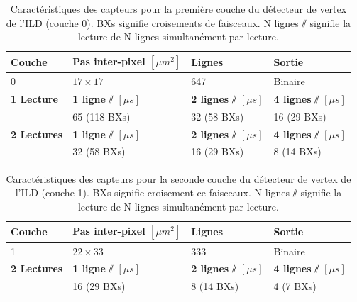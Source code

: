  \begin{table}[h]
  \centering
  \begin{tabular}{|l|l|l|l|}
  \hline
  \textbf{Couche}               & \textbf{ Pas inter-pixel} $[\mu m^2]$ & \textbf{ Lignes}                & \textbf{ Sortie}                \\ \hline
         0        & $17 \times 17$                  & 647                         & Binaire                     \\ \hline
  \textbf{1 Lecture}  & \textbf{1 ligne} $\sslash$ $[\mu s]$    & \textbf{2 lignes} $\sslash$ $[\mu s]$ & \textbf{4 lignes} $\sslash$ $[\mu s]$ \\ \hline
                 & 65 (118 BXs)                    & 32 (58 BXs)                 & 16 (29 BXs)                 \\ \hline
  \textbf{2 Lectures} & \textbf{ 1 ligne} $\sslash$  $[\mu s]$     & \textbf{ 2 lignes} $\sslash$ $[\mu s]$ & \textbf{ 4 lignes} $\sslash$ $[\mu s]$ \\ \hline
                 & 32 (58 BXs)                     & 16 (29 BXs)                 & 8 (14 BXs)                  \\ \hline
  \end{tabular}
  \caption{Caract\'eristiques des capteurs pour la premi\`ere couche du d\'etecteur de vertex de l'ILD (couche 0). BXs signifie croisements de faisceaux. N lignes $\sslash$ signifie la lecture de N lignes simultan\'ement par lecture.}
  \label{tab:L0_prop}
  \end{table}
  
  \begin{table}[h]
  \centering
  \begin{tabular}{|l|l|l|l|}
  \hline
  \textbf{Couche}    & \textbf{ Pas inter-pixel} $[\mu m^2]$ & \textbf{ Lignes}                & \textbf{ Sortie}                \\ \hline
        1        & $22 \times 33$                    & 333                         & Binaire                     \\ \hline
  \textbf{ 2 Lectures} & \textbf{ 1 ligne} $\sslash$  $[\mu s]$       & \textbf{ 2 lignes} $\sslash$ $[\mu s]$ & \textbf{ 4 lignes} $\sslash$ $[\mu s]$ \\ \hline
                 & 16 (29 BXs)                       & 8 (14 BXs)                  & 4 (7 BXs)                   \\ \hline
  \end{tabular}
  \caption{Caract\'eristiques des capteurs pour la seconde couche du d\'etecteur de vertex de l'ILD (couche 1). BXs signifie croisement ce faisceaux. N lignes $\sslash$ signifie la lecture de N lignes simultan\'ement par lecture.}
  \label{fig:L1_prop}
  \end{table}
  
